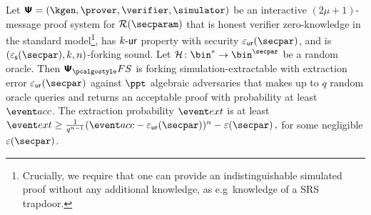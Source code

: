 \begin{theorem}
  \label{thm:se}
  Let $\ps = (\kgen, \prover, \verifier, \simulator)$ be an interactive
  $(2 \mu + 1)$-message proof system for $\RELGEN(\secparam)$ that is honest
  verifier zero-knowledge in the standard model\footnote{Crucially, we require
    that one can provide an indistinguishable simulated proof without any
    additional knowledge, as e.g~knowledge of a SRS trapdoor.}, has ${k\text{-}\mathsf{ur}}$
  property with security $\epsur(\secpar)$, and is $(\epss(\secpar), k, n)$-forking sound.
%
Let $\ro\colon \bin^{*} \to \bin^{\secpar}$ be a random oracle. 
Then $\psfs$ is forking simulation-extractable with extraction error $\epsur(\secpar)$
against $\ppt$ algebraic adversaries that makes up to $q$ random oracle queries and
returns an acceptable proof with probability at least $\accProb$. 
The extraction probability $\extProb$ is at least
\(
	\extProb \geq \frac{1}{q^{n - 1}} (\accProb - \epsur(\secpar))^{n} -\eps(\secpar)\,,
\)
for some negligible $\eps(\secpar)$.	
\end{theorem}
